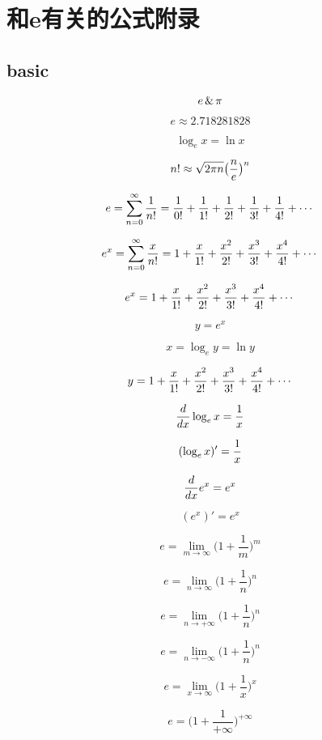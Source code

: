 %
%

\chapter{和e有关的公式附录}

\section{basic}

$$  e \hspace{0.05cm} \& \hspace{0.05cm}  \pi $$

$$ e \approx  2.718281828 $$

$$ \log_ex = \ln x  $$

$$ n! \approx \sqrt{2\pi n}\big({n \over e}\big)^n $$

$$ e = \sum_{n=0}^\infty {1\over n!} = {1\over 0!} + {1 \over 1!} + {1\over 2!} + {1 \over 3!} + {1 \over 4!} + \cdots $$

$$ e^x = \sum_{n=0}^\infty {x\over n!} = 1 + {x \over 1!} + {x^2\over 2!} + {x^3 \over 3!} + {x^4 \over 4!}  + \cdots $$

$$ e^x = 1 + {x \over 1!} + {x^2\over 2!} + {x ^3\over 3!} + {x ^4\over 4!}  + \cdots $$

$$  y=e^x $$  

$$  x= \log_e y = \ln y $$

$$ y = 1 + {x \over 1!} + {x^2\over 2!} + {x ^3\over 3!} + {x ^4\over 4!}  + \cdots $$



$$ {d \over dx} \log_e x = {1 \over x} $$

$$ ( \log_e x)'  = {1 \over x} $$

$$ {d \over dx} e^x = e^x $$

$$  (e^x)' = e^x $$

$$ e = \lim_{m\rightarrow \infty} \big(1+\frac{1}{m}\big)^m $$

$$ e = \lim_{n\rightarrow \infty} \big(1+\frac{1}{n}\big)^n $$


$$ e = \lim_{n\rightarrow +\infty} \big(1+\frac{1}{n}\big)^n $$

$$ e = \lim_{n\rightarrow -\infty} \big(1+\frac{1}{n}\big)^n $$


$$ e = \lim_{x \rightarrow \infty} \big(1+\frac{1}{x}\big)^x $$

$$ e =  \big(1+\frac{1}{+\infty }\big)^{+\infty} $$

